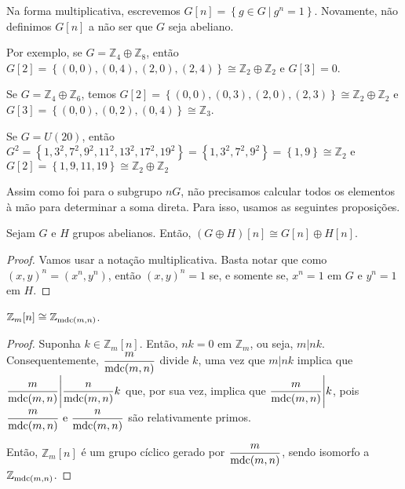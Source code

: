     	\par\vspace{0.3cm} Na forma multiplicativa, escrevemos 
    	$G[n] = \left\{ g\in G \ \vert \ g^n=1 \right\}$.
    	Novamente, não definimos $G[n]$ a não ser que $G$ seja abeliano. 
    	\begin{example}
    	Por exemplo, se $G = \mathbb{Z}_4\oplus\mathbb{Z}_8$, então 
    	$G[2] = \left\{ (0,0), (0,4), (2,0), (2,4) \right\}\cong\mathbb{Z}_2\oplus\mathbb{Z}_2$ e $G[3] = 0$.
    	\end{example}
    	\begin{example}
    	Se $G = \mathbb{Z}_4\oplus\mathbb{Z}_6$, temos 
    	$G[2] = \left\{ (0,0), (0,3), (2,0), (2,3) \right\}\cong \mathbb{Z}_2\oplus\mathbb{Z}_2$ e 
    	$G[3] = \left\{ (0,0), (0,2), (0,4) \right\}\cong\mathbb{Z}_3$.
    	\end{example}
    	\begin{example}
    	Se $G = U(20)$, então 
    	$G^2 = \left\{ 1, 3^2, 7^2, 9^2, 11^2, 13^2, 17^2, 19^2 \right\} 
    	= \left\{ 1, 3^2, 7^2, 9^2 \right\} = \left\{ 1, 9 \right\}\cong\mathbb{Z}_2$ e 
    	$G[2] = \left\{ 1,9,11,19 \right\}\cong\mathbb{Z}_2\oplus\mathbb{Z}_2$
    	\end{example}
    	Assim como foi para o subgrupo $nG$, não precisamos calcular todos os 
    	elementos à mão para determinar a soma direta. Para isso, usamos as seguintes proposições.
    	\begin{prop}
    	\label{subgrupo abeliano G[n]}
    		Sejam $G$ e $H$ grupos abelianos. Então, $(G\oplus H)[n] \cong G[n]\oplus H[n]$.
    	\end{prop}
    	\begin{proof}
    		Vamos usar a notação multiplicativa. Basta notar que como $(x,y)^n = (x^n, y^n)$, 
    		então $(x,y)^n = 1$ se, e somente se, $x^n = 1$ em $G$ e $y^n = 1$ em $H$. 
    	\end{proof}
    	\begin{prop}
    	\label{regra G[n]}
    		$\mathbb{Z}_m[n]\cong \mathbb{Z}_{\operatorname{mdc}(m,n)}$.
    	\end{prop}
    	\begin{proof}
    		Suponha $k\in \mathbb{Z}_m[n]$. Então, $nk = 0$ em $\mathbb{Z}_m$, ou seja, $m|nk$. 
    		Consequentemente, $\displaystyle{ \frac{m}{\operatorname{mdc}(m,n)} }$ divide $k$, uma vez que $m|nk$ implica 
    		que $\displaystyle{ \frac{m}{\operatorname{mdc}(m,n)} \Bigg| \frac{n}{\operatorname{mdc}(m,n)}k  }$ que, por sua vez, implica 
    		que $\displaystyle{ \frac{m}{\operatorname{mdc}(m,n)} }\Bigg| k$, pois 
    		$\displaystyle{ \frac{m}{\operatorname{mdc}(m,n)}\text{ e }\frac{n}{\operatorname{mdc}(m,n)}  }$ são relativamente primos.
    		
    		\par\vspace{0.3cm} Então, $\mathbb{Z}_m[n]$ é um grupo cíclico gerado por
    		$\displaystyle{\frac{m}{\operatorname{mdc}(m,n)}}$, sendo isomorfo a $\mathbb{Z}_{\operatorname{mdc}(m,n)}$.
    	\end{proof}
